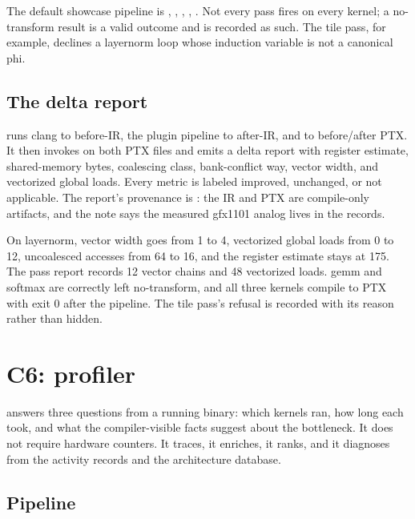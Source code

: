 The default showcase pipeline is
,\allowbreak
{},\allowbreak
{},\allowbreak
{},\allowbreak
{}.
Not every pass fires on every kernel; a no-transform result is a valid
outcome and is recorded as such. The tile pass, for example, declines a
layernorm loop whose induction variable is not a canonical 
phi.

\subsection{The delta report}
\label{sec:c5-delta}

 runs
clang to before-IR, the plugin pipeline to after-IR, and  to
before/after PTX. It then invokes  on both PTX files
and emits a delta report with register estimate, shared-memory bytes,
coalescing class, bank-conflict way, vector width, and vectorized global
loads. Every metric is labeled improved, unchanged, or not applicable. The
report's provenance is : the IR and PTX are compile-only
artifacts, and the note says the measured gfx1101 analog lives in the
 records.

On layernorm, vector width goes from 1 to 4, vectorized global loads from 0 to
12, uncoalesced accesses from 64 to 16, and the register estimate stays at
175. The pass report records 12 vector chains and 48 vectorized loads. gemm
and softmax are correctly left no-transform, and all three kernels compile to
PTX with exit 0 after the pipeline. The tile pass's refusal is recorded with
its reason rather than hidden.

\section{C6: profiler}
\label{sec:c6}

 answers three questions from a running binary: which
kernels ran, how long each took, and what the compiler-visible facts suggest
about the bottleneck. It does not require hardware counters. It traces, it
enriches, it ranks, and it diagnoses from the activity records and the
architecture database.

\subsection{Pipeline}
\label{sec:c6-pipeline}

